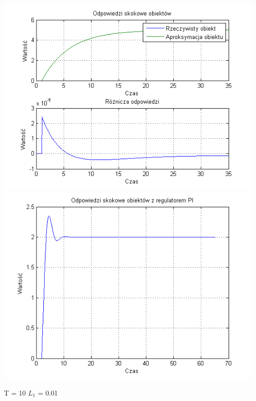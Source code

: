 \documentclass[10pt,a4paper]{article}
\begin{document}
\begin{center}
\includegraphics[scale=1]{images/jeden/skrypt_205.png}\\
\includegraphics[scale=1]{images/jeden/skrypt_206.png}\\
\end{center}
\newpage
T = 10
$L_1$ = 0.01
\end{document}
